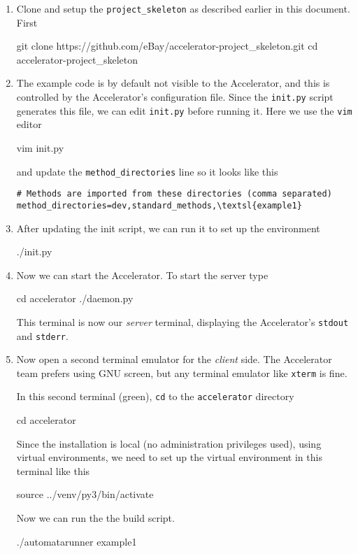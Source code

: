\documentclass[a4paper]{article}
\begin{document}
\begin{enumerate}
\item Clone and setup the \texttt{project\_skeleton} as described
  earlier in this document.  First
\begin{shell}
git clone https://github.com/eBay/accelerator-project_skeleton.git
cd accelerator-project_skeleton
\end{shell}

\item The example code is by default not visible to the Accelerator,
  and this is controlled by the Accelerator's configuration file.
  Since the \texttt{init.py} script generates this file, we can edit
  \texttt{init.py} before running it.  Here we use the \texttt{vim}
  editor
\begin{shell}
vim init.py
\end{shell}
  and update the \texttt{method\_directories} line so it looks like this
\begin{snugshade}
\begin{Verbatim}[commandchars=\\\{\}]
# Methods are imported from these directories (comma separated)
method_directories=dev,standard_methods,\textsl{example1}
\end{Verbatim}
\end{snugshade}

\item After updating the init script, we can run it to set up the environment
\begin{shell}
./init.py
\end{shell}

\item Now we can start the Accelerator.  To start the server type
  \begin{shell}
cd accelerator
./daemon.py
  \end{shell}
  This terminal is now our \textsl{server} terminal, displaying the
  Accelerator's \texttt{stdout} and \texttt{stderr}.
  
\item Now open a second terminal emulator for the \textsl{client}
  side.  The Accelerator team prefers using GNU screen, but any
  terminal emulator like \texttt{xterm} is fine.

  In this second terminal (green), \texttt{cd} to the
  \texttt{accelerator} directory
\begin{shell2}
cd accelerator
\end{shell2}
Since the installation is local (no administration privileges used),
using virtual environments, we need to set up the virtual environment
in this terminal like this
\begin{shell2}
source ../venv/py3/bin/activate
\end{shell2}
Now we can run the the build script.
\begin{shell2}
./automatarunner example1
\end{shell2}
\end{enumerate}
\end{document}
